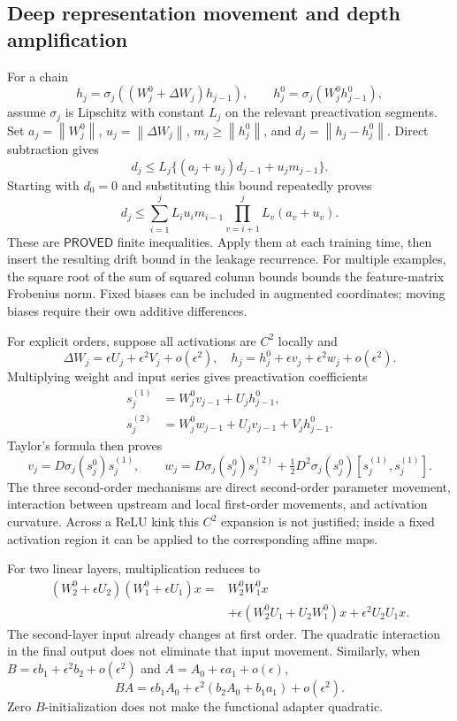 \documentclass[12pt,a4paper]{article}
\theoremstyle{readable}
\theoremstyle{definition}\newtheorem{example}[theorem]{Example}
\newcommand{\norm}[1]{\left\|#1\right\|}
\newcommand{\PP}{\mathsf{PROVED}}\newcommand{\FF}{\mathsf{FALSE}}
\begin{document}
\subsection{Deep representation movement and depth amplification}
For a chain
\[
h_j=\sigma_j((W_j^0+\Delta W_j)h_{j-1}),
\qquad h_j^0=\sigma_j(W_j^0h_{j-1}^0),
\]
assume \(\sigma_j\) is Lipschitz with constant \(L_j\) on the relevant preactivation segments. Set \(a_j=\norm{W_j^0}\), \(u_j=\norm{\Delta W_j}\), \(m_j\ge\norm{h_j^0}\), and \(d_j=\norm{h_j-h_j^0}\). Direct subtraction gives
\[
d_j\le L_j\{(a_j+u_j)d_{j-1}+u_jm_{j-1}\}.
\]
Starting with \(d_0=0\) and substituting this bound repeatedly proves
\[
d_j\le\sum_{i=1}^jL_i u_i m_{i-1}
\prod_{v=i+1}^j L_v(a_v+u_v).
\]
These are \(\PP\) finite inequalities. Apply them at each training time, then insert the resulting drift bound in the leakage recurrence. For multiple examples, the square root of the sum of squared column bounds bounds the feature-matrix Frobenius norm. Fixed biases can be included in augmented coordinates; moving biases require their own additive differences.

For explicit orders, suppose all activations are \(C^2\) locally and
\[
\Delta W_j=\epsilon U_j+\epsilon^2V_j+o(\epsilon^2),\quad
h_j=h_j^0+\epsilon v_j+\epsilon^2w_j+o(\epsilon^2).
\]
Multiplying weight and input series gives preactivation coefficients
\begin{align*}
s_j^{(1)}&=W_j^0v_{j-1}+U_jh_{j-1}^0,\\
s_j^{(2)}&=W_j^0w_{j-1}+U_jv_{j-1}+V_jh_{j-1}^0.
\end{align*}
Taylor's formula then proves
\[
v_j=D\sigma_j(s_j^0)s_j^{(1)},\qquad
w_j=D\sigma_j(s_j^0)s_j^{(2)}
+\tfrac12D^2\sigma_j(s_j^0)[s_j^{(1)},s_j^{(1)}].
\]
The three second-order mechanisms are direct second-order parameter movement, interaction between upstream and local first-order movements, and activation curvature. Across a ReLU kink this \(C^2\) expansion is not justified; inside a fixed activation region it can be applied to the corresponding affine maps.

For two linear layers, multiplication reduces to
\begin{align*}
(W_2^0+\epsilon U_2)(W_1^0+\epsilon U_1)x
={}&W_2^0W_1^0x\\
&+\epsilon(W_2^0U_1+U_2W_1^0)x
+\epsilon^2U_2U_1x.
\end{align*}
The second-layer input already changes at first order. The quadratic interaction in the final output does not eliminate that input movement. Similarly, when \(B=\epsilon b_1+\epsilon^2b_2+o(\epsilon^2)\) and \(A=A_0+\epsilon a_1+o(\epsilon)\),
\[
BA=\epsilon b_1A_0+\epsilon^2(b_2A_0+b_1a_1)+o(\epsilon^2).
\]
Zero \(B\)-initialization does not make the functional adapter quadratic.
\end{document}
